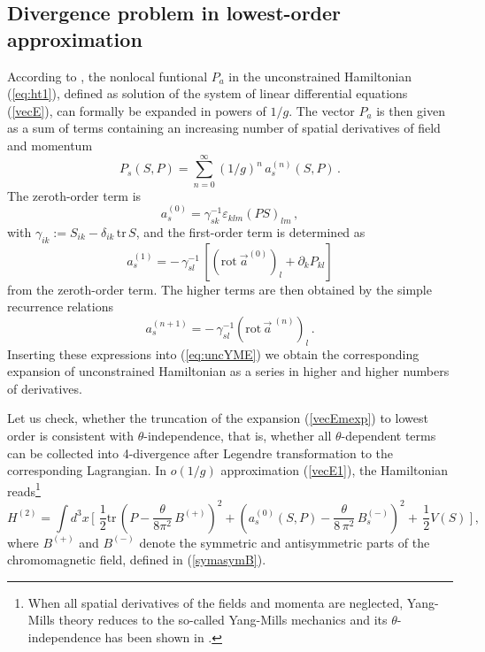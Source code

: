 \documentclass[a4paper,12pt]{article}
\begin{document}

\subsection{Divergence problem in lowest-order approximation}

\label{Sec:IV1}

According to \cite{KP}, the nonlocal funtional $P_a$ in the
unconstrained Hamiltonian (\ref{eq:ht1}), defined as solution of the system of
linear differential equations (\ref{vecE}), can formally be expanded
in powers of $1/g$.
The vector $P_a$ is then given as a sum of terms containing an increasing
number of spatial derivatives of field and momentum
\begin{equation}
\label{vecEmexp}
P_s (S, P) = \sum_{n=0}^{\infty}(1/g)^n\, a_s^{(n)}(S, P)\,.
\end{equation}
The zeroth-order term is
\begin{equation}
\label{vecE1}
a^{(0)}_{s} =
\gamma^{-1}_{sk}\varepsilon_{klm}\left(PS\right)_{lm}\,,
\end{equation}
with $\gamma_{ik}:= S_{ik} - \delta_{ik}\, \mbox{tr}\, S$,
and the first-order term is determined as
\begin{equation}
\label{vecE2}
a^{(1)}_{s} = - \, \gamma^{-1}_{sl}\,
\left[
(\mbox{rot}\ \vec{a}^{(0)})_l + \partial_k P_{kl}
\right]
\end{equation}
from the zeroth-order term.
The higher terms are then obtained by the simple recurrence relations
\begin{equation} \label{vecE3}
a^{(n+1)}_{s} =
- \,\gamma^{-1}_{sl}(\mbox{rot}\, {\vec {a}}^{\ (n)})_l \,.
\end{equation}
Inserting these expressions into (\ref{eq:uncYME})
we obtain the corresponding expansion of unconstrained Hamiltonian as
a series in higher and higher numbers of derivatives.

Let us check, whether the truncation of the expansion
(\ref{vecEmexp}) to lowest order is consistent with $\theta$-independence,
that is, whether all $\theta$-dependent
terms can be collected into 4-divergence after Legendre
transformation to the corresponding Lagrangian.
In $o(1/g)$ approximation (\ref{vecE1}), the Hamiltonian reads\footnote{
When all spatial derivatives of the
fields and momenta are neglected, Yang-Mills theory reduces to the so-called
Yang-Mills mechanics and its $\theta$-independence has been shown
in \cite{AHG}.
}
\begin{equation}
\label{eq:ham2}
H^{(2)} =
\int d^3{x}\,
\biggl[\,
\, \frac{1}{2}\mbox{tr}\,\left(P - \frac{\theta}{8 \pi^2}\, B^{(+)}\right)^2
+\left(a_s^{(0)}(S, P) - \frac{\theta}{8\, \pi^2}\, B^{(-)}_s
\right)^2 + \,\frac{1}{2} V(S) \ \biggr]\,,
\end{equation}
where $B^{(+)}$ and $B^{(-)}$ denote the symmetric and antisymmetric
parts of the chromomagnetic field, defined in (\ref{symasymB}).
\end{document}
